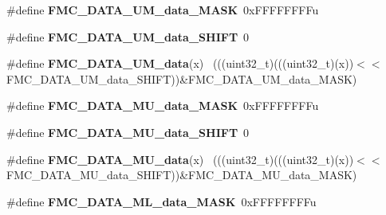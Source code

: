 \begin{DoxyCompactItemize}
\item 
\hypertarget{group___f_m_c___register___masks_ga2ffb6d3dab29e72dd204610e55203776}{}\#define {\bfseries F\+M\+C\+\_\+\+D\+A\+T\+A\+\_\+\+U\+M\+\_\+data\+\_\+\+M\+A\+S\+K}~0x\+F\+F\+F\+F\+F\+F\+F\+Fu\label{group___f_m_c___register___masks_ga2ffb6d3dab29e72dd204610e55203776}

\item 
\hypertarget{group___f_m_c___register___masks_ga2d90e0b820f52bd143a1317d9b0e2cbb}{}\#define {\bfseries F\+M\+C\+\_\+\+D\+A\+T\+A\+\_\+\+U\+M\+\_\+data\+\_\+\+S\+H\+I\+F\+T}~0\label{group___f_m_c___register___masks_ga2d90e0b820f52bd143a1317d9b0e2cbb}

\item 
\hypertarget{group___f_m_c___register___masks_gaf50fc3b88144088776cb4360a98da185}{}\#define {\bfseries F\+M\+C\+\_\+\+D\+A\+T\+A\+\_\+\+U\+M\+\_\+data}(x)                                        ~(((uint32\+\_\+t)(((uint32\+\_\+t)(x))$<$$<$F\+M\+C\+\_\+\+D\+A\+T\+A\+\_\+\+U\+M\+\_\+data\+\_\+\+S\+H\+I\+F\+T))\&F\+M\+C\+\_\+\+D\+A\+T\+A\+\_\+\+U\+M\+\_\+data\+\_\+\+M\+A\+S\+K)\label{group___f_m_c___register___masks_gaf50fc3b88144088776cb4360a98da185}

\item 
\hypertarget{group___f_m_c___register___masks_ga078f3f0e744e43b7abe1c85679f723d6}{}\#define {\bfseries F\+M\+C\+\_\+\+D\+A\+T\+A\+\_\+\+M\+U\+\_\+data\+\_\+\+M\+A\+S\+K}~0x\+F\+F\+F\+F\+F\+F\+F\+Fu\label{group___f_m_c___register___masks_ga078f3f0e744e43b7abe1c85679f723d6}

\item 
\hypertarget{group___f_m_c___register___masks_gaa2938e6c956799c71072fb1aec3f4f86}{}\#define {\bfseries F\+M\+C\+\_\+\+D\+A\+T\+A\+\_\+\+M\+U\+\_\+data\+\_\+\+S\+H\+I\+F\+T}~0\label{group___f_m_c___register___masks_gaa2938e6c956799c71072fb1aec3f4f86}

\item 
\hypertarget{group___f_m_c___register___masks_gae71dcc21ff26f043e7ba06dbeeeaaaa8}{}\#define {\bfseries F\+M\+C\+\_\+\+D\+A\+T\+A\+\_\+\+M\+U\+\_\+data}(x)                                        ~(((uint32\+\_\+t)(((uint32\+\_\+t)(x))$<$$<$F\+M\+C\+\_\+\+D\+A\+T\+A\+\_\+\+M\+U\+\_\+data\+\_\+\+S\+H\+I\+F\+T))\&F\+M\+C\+\_\+\+D\+A\+T\+A\+\_\+\+M\+U\+\_\+data\+\_\+\+M\+A\+S\+K)\label{group___f_m_c___register___masks_gae71dcc21ff26f043e7ba06dbeeeaaaa8}

\item 
\hypertarget{group___f_m_c___register___masks_ga61f00faf9ac224b96366d335e43c3f76}{}\#define {\bfseries F\+M\+C\+\_\+\+D\+A\+T\+A\+\_\+\+M\+L\+\_\+data\+\_\+\+M\+A\+S\+K}~0x\+F\+F\+F\+F\+F\+F\+F\+Fu\label{group___f_m_c___register___masks_ga61f00faf9ac224b96366d335e43c3f76}


\end{DoxyCompactItemize}
